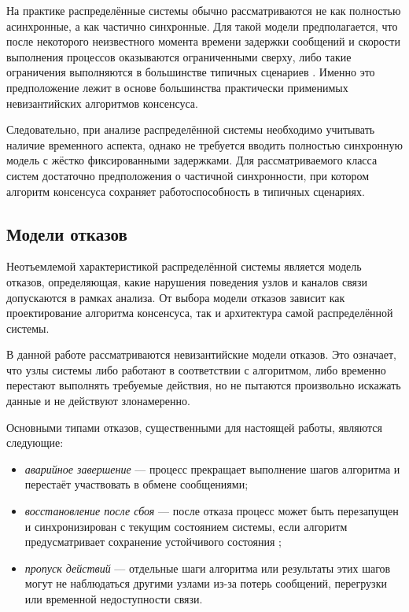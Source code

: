 На практике распределённые системы обычно рассматриваются не как полностью
асинхронные, а как частично синхронные. Для такой модели предполагается, что
после некоторого неизвестного момента времени задержки сообщений и скорости
выполнения процессов оказываются ограниченными сверху, либо такие ограничения
выполняются в большинстве типичных сценариев \cite{cachin11}. Именно это
предположение лежит в основе большинства практически применимых невизантийских
алгоритмов консенсуса.

Следовательно, при анализе распределённой системы необходимо учитывать наличие
временного аспекта, однако не требуется вводить полностью синхронную модель с
жёстко фиксированными задержками. Для рассматриваемого класса систем достаточно
предположения о частичной синхронности, при котором алгоритм консенсуса
сохраняет работоспособность в типичных сценариях.

\subsection{Модели отказов}

Неотъемлемой характеристикой распределённой системы является модель отказов,
определяющая, какие нарушения поведения узлов и каналов связи допускаются в
рамках анализа. От выбора модели отказов зависит как проектирование алгоритма
консенсуса, так и архитектура самой распределённой системы.

В данной работе рассматриваются невизантийские модели отказов. Это означает,
что узлы системы либо работают в соответствии с алгоритмом, либо временно
перестают выполнять требуемые действия, но не пытаются произвольно искажать
данные и не действуют злонамеренно.

Основными типами отказов, существенными для настоящей работы, являются
следующие:

\begin{itemize}
    \item \textit{аварийное завершение} --- процесс прекращает выполнение шагов
алгоритма и перестаёт участвовать в обмене сообщениями;
    \item \textit{восстановление после сбоя} --- после отказа процесс может
быть перезапущен и синхронизирован с текущим состоянием системы, если алгоритм
предусматривает сохранение устойчивого состояния \cite{skeen83};
    \item \textit{пропуск действий} --- отдельные шаги алгоритма или результаты
этих шагов могут не наблюдаться другими узлами из-за потерь сообщений,
перегрузки или временной недоступности связи.
\end{itemize}

